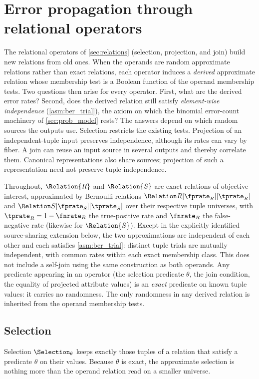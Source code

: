 \documentclass[ ../main.tex]{subfiles}
\begin{document}
\section{Error propagation through relational operators}
\label{sec:rel_algebra}
The relational operators of \cref{sec:relations} (selection, projection, and
join) build new relations from old ones. When the operands are random
approximate relations rather than exact relations, each operator induces a
\emph{derived} approximate relation whose membership test is a Boolean function
of the operand membership tests. Two questions then arise for every operator.
First, what are the derived error rates? Second, does the derived relation still
satisfy \emph{element-wise independence} (\cref{asm:ber_trial}), the axiom on
which the binomial error-count machinery of \cref{sec:prob_model} rests? The
answers depend on which random sources the outputs use. Selection restricts
the existing tests. Projection of an independent-tuple input preserves
independence, although its rates can vary by fiber. A join can reuse an input
source in several outputs and thereby correlate them. Canonical representations
also share sources; projection of such a representation need not preserve
tuple independence.

Throughout, $\Relation{R}$ and $\Relation{S}$ are exact relations of objective
interest, approximated by Bernoulli relations
$\ARelation{R}[\fprate_R][\tprate_R]$ and $\ARelation{S}[\fprate_S][\tprate_S]$
over their respective tuple universes, with $\tprate_R = 1 - \fnrate_R$ the
true-positive rate and $\fnrate_R$ the false-negative rate (likewise for
$\Relation{S}$). Except in the explicitly identified source-sharing extension
below, the two approximations are independent of each other and each satisfies
\cref{asm:ber_trial}: distinct tuple trials are mutually independent, with
common rates within each exact membership class. This does not include a
self-join using the same construction as both operands. Any predicate appearing in an operator
(the selection predicate $\theta$, the join condition, the equality of projected
attribute values) is an \emph{exact} predicate on known tuple values: it carries
no randomness. The only randomness in any derived relation is inherited from the
operand membership tests.

\subsection{Selection}
\label{sec:select}
Selection $\Selection_\theta$ keeps exactly those tuples of a relation that
satisfy a predicate $\theta$ on their values. Because $\theta$ is exact, the
approximate selection is nothing more than the operand relation read on a
smaller universe.
\end{document}
